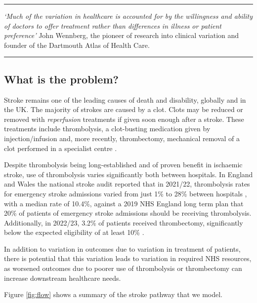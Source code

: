 

\vspace{5mm}
\hrule
\textit{`Much of the variation in healthcare is accounted for by the willingness and ability of doctors to offer treatment rather than differences in illness or patient preference'} John Wennberg, the pioneer of research into clinical variation and founder of the Dartmouth Atlas of Health Care.
\vspace{2mm}
\hrule

\subsection*{What is the problem?}

Stroke remains one of the leading causes of death and disability, globally and in the UK. The majority of strokes are caused by a clot. Clots may be reduced or removed with \textit{reperfusion} treatments if given soon enough after a stroke. These treatments include thrombolysis, a clot-busting medication given by injection/infusion \cite{emberson_effect_2014} and, more recently, thrombectomy, mechanical removal of a clot performed in a specialist centre \cite{fransen_time_2016}.

Despite thrombolysis being long-established and of proven benefit in ischaemic stroke, use of thrombolysis varies significantly both between hospitals. In England and Wales the national stroke audit reported that in 2021/22, thrombolysis rates for emergency stroke admissions varied from just 1\% to 28\% between hospitals \cite{sentinel_national_stroke_audit_programme_ssnap_2022}, with a median rate of 10.4\%, against a 2019 NHS England long term plan that 20\% of patients of emergency stroke admissions should be receiving thrombolysis. Additionally, in 2022/23, 3.2\% of patients received thrombectomy, significantly below the expected eligibility of at least 10\% \cite{mcmeekin_updating_2021}. 

In addition to variation in outcomes due to variation in treatment of patients, there is potential that this variation leads to variation in required NHS resources, as worsened outcomes due to poorer use of thrombolysis or thrombectomy can increase downstream healthcare needs.

Figure \ref{fig:flow} shows a summary of the stroke pathway that we model.

